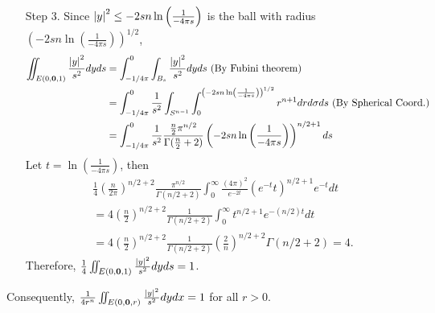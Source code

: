 \documentclass{article}
\begin{document}
\begin{enumerate}
    \item[Step 3.] Since $\abs{y}^2\leq -2sn\ln\left(\frac{1}{-4\pi s}\right)$ is the ball with radius $\left(-2sn\ln\left(\frac{1}{-4\pi s}\right)\right)^{1/2}$, 
    \begin{equation*}
    \begin{split}
        \iint_{E(0, \bm{0}, 1)} \frac{\abs{y}^2}{s^2}dyds&=\int_{-1/4\pi}^0\int_{B_s}\frac{\abs{y}^2}{s^2}dyds \text{ (By Fubini theorem)}\\
        &=\int_{-1/4\pi}^0 \frac{1}{s^2} \int_{S^{n-1}}\int_0^{\left(-2sn\ln\left(\frac{1}{-4\pi s}\right)\right)^{1/2}} r^{n+1}drd\sigma ds \text{ (By Spherical Coord.)}\\
        &=\int_{-1/4\pi}^0 \frac{1}{s^2}\frac{\frac{n}{2}\pi^{n/2}}{\Gamma(\frac{n}{2}+2)} \left(-2sn\ln\left(\frac{1}{-4\pi s}\right)\right)^{n/2+1} ds
    \end{split}
    \end{equation*}
    Let $t=\ln\left(\frac{1}{-4\pi s}\right)$, then 
    \begin{equation*}
        \begin{split}
            &\frac{1}{4}\left(\frac{n}{2\pi}\right)^{n/2+2}\frac{\pi^{n/2}}{\Gamma(n/2+2)}\int_{0}^\infty \frac{(4\pi)^2}{e^{-2t}} \left(e^{-t}t\right)^{n/2+1} e^{-t}dt \\
            &=4\left(\frac{n}{2}\right)^{n/2+2}\frac{1}{\Gamma(n/2+2)}\int_0^\infty t^{n/2+1}e^{-(n/2)t}dt \\
            &=4\left(\frac{n}{2}\right)^{n/2+2}\frac{1}{\Gamma(n/2+2)}\left(\frac{2}{n}\right)^{n/2+2}\Gamma(n/2+2)=4.
        \end{split}
    \end{equation*}
    Therefore, $\frac{1}{4}\iint_{E(0, \bm{0}, 1)} \frac{\abs{y}^2}{s^2}dyds=1$.
\end{enumerate}
Consequently, $\frac{1}{4r^n}\iint_{E(0, \bm{0}, r)}\frac{\abs{y}^2}{s^2}dydx=1$ for all $r>0$.
\end{document}
